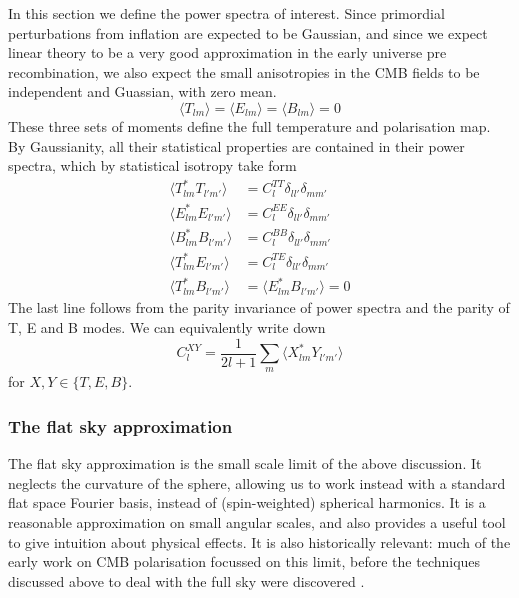 \documentclass[a4paper,10pt]{article}
\begin{document}
In this section we define the power spectra of interest. Since primordial perturbations from inflation are expected to be Gaussian, and since we expect linear theory to be a very good approximation in the early universe pre recombination, we also expect the small anisotropies in the CMB fields to be independent and Guassian, with zero mean. 
\begin{equation}
\langle T_{lm} \rangle = \langle E_{lm} \rangle = \langle B_{lm} \rangle = 0
\end{equation}
These three sets of moments define the full temperature and polarisation map. By Gaussianity, all their statistical properties are contained in their power spectra, which by statistical isotropy take form
\begin{equation}\begin{split}
\langle T_{lm}^*T_{l'm'} \rangle &= C^{TT}_l\delta_{ll'}\delta_{mm'}\\
\langle E_{lm}^*E_{l'm'} \rangle &= C^{EE}_l\delta_{ll'}\delta_{mm'}\\
\langle B_{lm}^*B_{l'm'} \rangle &= C^{BB}_l\delta_{ll'}\delta_{mm'}\\
\langle T_{lm}^*E_{l'm'} \rangle &= C^{TE}_l\delta_{ll'}\delta_{mm'}\\
\langle T_{lm}^*B_{l'm'} \rangle &= \langle E_{lm}^*B_{l'm'} \rangle = 0
\end{split}\end{equation}
The last line follows from the parity invariance of power spectra and the parity of T, E and B modes. We can equivalently write down
\begin{equation}
C_l^{XY} = \frac{1}{2l+1}\sum_m \langle X_{lm}^*Y_{l'm'}\rangle
\label{powerspectra}
\end{equation}
for $X,Y \in \{T, E,B\}$. 


\subsubsection{The flat sky approximation}

The flat sky approximation is the small scale limit of the above discussion. It neglects the curvature of the sphere, allowing us to work instead with a standard flat space Fourier basis, instead of (spin-weighted) spherical harmonics. It is a reasonable approximation on small angular scales, and also provides a useful tool to give intuition about physical effects. It is also historically relevant: much of the early work on CMB polarisation focussed on this limit, before the techniques discussed above to deal with the full sky were discovered \cite{all-sky}.\\
\end{document}
